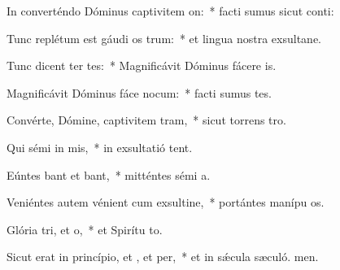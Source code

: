 \item In converténdo Dóminus captivitem on:~* facti sumus sicut conti:
\item Tunc replétum est gáudi os trum:~* et lingua nostra exsultane.
\item Tunc dicent ter tes:~* Magnificávit Dóminus fácere  is.
\item Magnificávit Dóminus fáce nocum:~* facti sumus tes.
\item Convérte, Dómine, captivitem tram,~* sicut torrens  tro.
\item Qui sémi in mis,~* in exsultatió tent.
\item Eúntes bant et bant,~* mitténtes sémi a.
\item Veniéntes autem vénient cum exsultine,~* portántes manípu os.
\item Glória tri, et o,~* et Spirítu to.
\item Sicut erat in princípio, et , et per,~* et in sǽcula sæculó. men.
